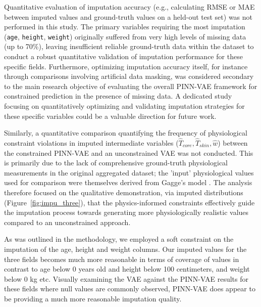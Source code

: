Quantitative evaluation of imputation accuracy (e.g., calculating RMSE or MAE between imputed values and ground-truth values on a held-out test set) was not performed in this study. The primary variables requiring the most imputation (\texttt{age}, \texttt{height}, \texttt{weight}) originally suffered from very high levels of missing data (up to 70\%), leaving insufficient reliable ground-truth data within the dataset to conduct a robust quantitative validation of imputation performance for these specific fields. Furthermore, optimizing imputation accuracy itself, for instance through comparisons involving artificial data masking, was considered secondary to the main research objective of evaluating the overall PINN-VAE framework for constrained prediction in the presence of missing data. A dedicated study focusing on quantitatively optimizing and validating imputation strategies for these specific variables could be a valuable direction for future work.

Similarly, a quantitative comparison quantifying the frequency of physiological constraint violations in imputed intermediate variables ($\hat{T}_{core}, \hat{T}_{skin}, \hat{w}$) between the constrained PINN-VAE and an unconstrained VAE was not conducted. This is primarily due to the lack of comprehensive ground-truth physiological measurements in the original aggregated dataset; the 'input' physiological values used for comparison were themselves derived from Gagge's model \cite{gagge1986standard}. The analysis therefore focused on the qualitative demonstration, via imputed distributions (Figure~\ref{fig:impu_three}), that the physics-informed constraints effectively guide the imputation process towards generating more physiologically realistic values compared to an unconstrained approach.

As was outlined in the methodology, we employed a soft constraint on the imputation of the age, height and weight columns. Our imputed values for the three fields becomes much more reasonable in terms of coverage of values in contrast to age below 0 years old and height below 100 centimeters, and weight below 0 kg etc. Visually examining the VAE against the PINN-VAE results for these fields where null values are commonly observed, PINN-VAE does appear to be providing a much more reasonable imputation quality. %

